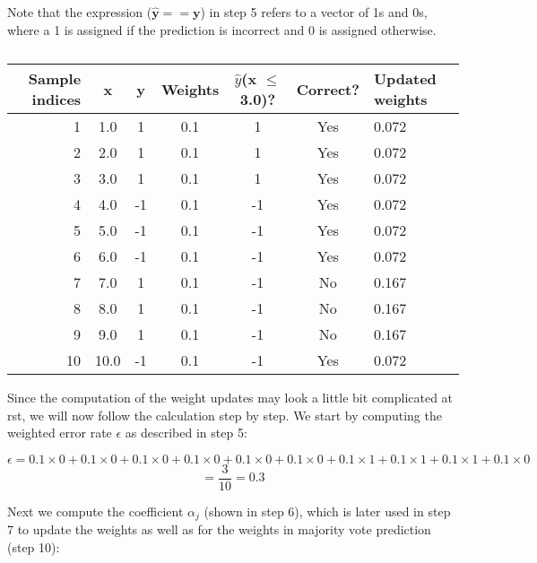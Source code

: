 \documentclass[letterpaper]{report}
\begin{document}
Note that the expression ($\mathbf{\hat{y}} == \mathbf{y}$) in step 5 refers to a vector of 1s and 0s, where a 1 is assigned if the prediction is incorrect and 0 is assigned otherwise.

\begin{table}[!htbp]
\centering
\caption*{}
\label{}
\begin{tabular}{r | c c c c c | l}
\hline
Sample indices & x    & y  & Weights & $\hat{y}$(x $\le$ 3.0)? & Correct? & Updated weights \\ \hline
1              & 1.0  & 1  & 0.1     & 1                       & Yes      & 0.072           \\ 
2              & 2.0  & 1  & 0.1     & 1                       & Yes      & 0.072           \\ 
3              & 3.0  & 1  & 0.1     & 1                       & Yes      & 0.072           \\
4              & 4.0  & -1 & 0.1     & -1                      & Yes      & 0.072           \\ 
5              & 5.0  & -1 & 0.1     & -1                      & Yes      & 0.072           \\
6              & 6.0  & -1 & 0.1     & -1                      & Yes      & 0.072           \\ 
7              & 7.0  & 1  & 0.1     & -1                      & No       & 0.167           \\ 
8              & 8.0  & 1  & 0.1     & -1                      & No       & 0.167           \\
9              & 9.0  & 1  & 0.1     & -1                      & No       & 0.167           \\ 
10             & 10.0 & -1 & 0.1     & -1                      & Yes      & 0.072           \\  \hline
\end{tabular}
\end{table}

Since the computation of the weight updates may look a little bit complicated at  rst, we will now follow the calculation step by step. We start by computing the weighted error rate $\epsilon$ as described in step 5:

\[
\epsilon = 0.1\times 0+0.1\times 0+0.1 \times 0+0.1 \times 0+0.1 \times 0+0.1 \times 0+0.1\times 1+0.1 \times 1 + 0.1 \times 1+0.1 \times 0
\]
\[
= \frac{3}{10} = 0.3
\]

Next we compute the coefficient $\alpha_j$ (shown in step 6), which is later used in step 7 to update the weights as well as for the weights in majority vote prediction (step 10):
\end{document}

